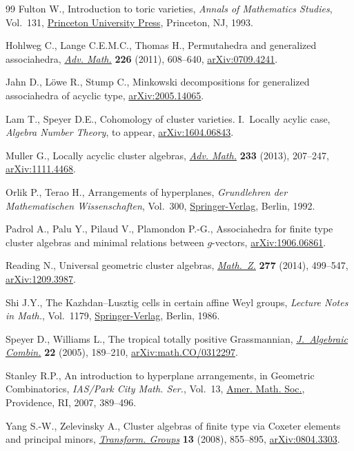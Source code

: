 \begin{thebibliography}{99}
Fulton W., Introduction to toric varieties, \textit{Annals of Mathematics
 Studies}, Vol.~131, \href{https://doi.org/10.1515/9781400882526}{Princeton University Press}, Princeton, NJ, 1993.

Hohlweg C., Lange C.E.M.C., Thomas H., Permutahedra and generalized
 associahedra, \href{https://doi.org/10.1016/j.aim.2010.07.005}{\textit{Adv. Math.}} \textbf{226} (2011), 608--640,
 \href{https://arxiv.org/abs/0709.4241}{arXiv:0709.4241}.

Jahn D., L\"owe R., Stump C., Minkowski decompositions for generalized
 associahedra of acyclic type, \href{https://arxiv.org/abs/2005.14065}{arXiv:2005.14065}.

Lam T., Speyer D.E., Cohomology of cluster varieties. {I}.~{L}ocally acylic
 case, \textit{Algebra Number Theory}, {t}o appear, \href{https://arxiv.org/abs/1604.06843}{arXiv:1604.06843}.

Muller G., Locally acyclic cluster algebras, \href{https://doi.org/10.1016/j.aim.2012.10.002}{\textit{Adv. Math.}} \textbf{233}
 (2013), 207--247, \href{https://arxiv.org/abs/1111.4468}{arXiv:1111.4468}.

Orlik P., Terao H., Arrangements of hyperplanes, \textit{Grundlehren der
 Mathematischen Wissenschaften}, Vol.~300, \href{https://doi.org/10.1007/978-3-662-02772-1}{Springer-Verlag}, Berlin, 1992.

Padrol A., Palu Y., Pilaud V., Plamondon P.-G., Associahedra for finite type
 cluster algebras and minimal relations between $g$-vectors,
 \href{https://arxiv.org/abs/1906.06861}{arXiv:1906.06861}.

Reading N., Universal geometric cluster algebras, \href{https://doi.org/10.1007/s00209-013-1264-4}{\textit{Math.~Z.}}
 \textbf{277} (2014), 499--547, \href{https://arxiv.org/abs/1209.3987}{arXiv:1209.3987}.

Shi J.Y., The {K}azhdan--{L}usztig cells in certain affine {W}eyl groups,
 \textit{Lecture Notes in Math.}, Vol.~1179, \href{https://doi.org/10.1007/BFb0074968}{Springer-Verlag}, Berlin, 1986.

Speyer D., Williams L., The tropical totally positive {G}rassmannian,
 \href{https://doi.org/10.1007/s10801-005-2513-3}{\textit{J.~Algebraic Combin.}} \textbf{22} (2005), 189--210,
 \href{https://arxiv.org/abs/math.CO/0312297}{arXiv:math.CO/0312297}.

Stanley R.P., An introduction to hyperplane arrangements, in Geometric
 Combinatorics, \textit{IAS/Park City Math. Ser.}, Vol.~13, \href{https://doi.org/10.1090/pcms/013/08}{Amer. Math. Soc.},
 Providence, RI, 2007, 389--496.

Yang S.-W., Zelevinsky A., Cluster algebras of finite type via {C}oxeter
 elements and principal minors, \href{https://doi.org/10.1007/s00031-008-9025-x}{\textit{Transform. Groups}} \textbf{13} (2008),
 855--895, \href{https://arxiv.org/abs/0804.3303}{arXiv:0804.3303}.

\end{thebibliography}
